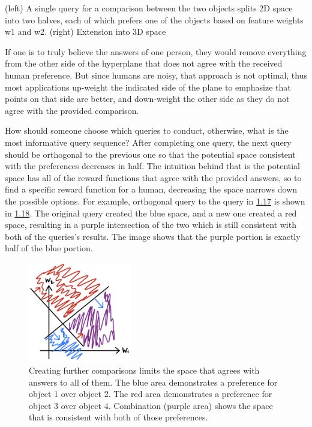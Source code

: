 \documentclass[
  letterpaper,
  DIV=11,
  numbers=noendperiod,
  oneside]{scrreprt}
\theoremstyle{remark}
\begin{document}
(left) A single query for a comparison between the two objects splits 2D
space into two halves, each of which prefers one of the objects based on
feature weights {w1} and {w2}. (right) Extension into 3D space

If one is to truly believe the answers of one person, they would remove
everything from the other side of the hyperplane that does not agree
with the received human preference. But since humans are noisy, that
approach is not optimal, thus most applications up-weight the indicated
side of the plane to emphasize that points on that side are better, and
down-weight the other side as they do not agree with the provided
comparison.

How should someone choose which queries to conduct, otherwise, what is
the most informative query sequence? After completing one query, the
next query should be orthogonal to the previous one so that the
potential space consistent with the preferences decreases in half. The
intuition behind that is the potential space has all of the reward
functions that agree with the provided answers, so to find a specific
reward function for a human, decreasing the space narrows down the
possible options. For example, orthogonal query to the query in
\hyperref[fig:2dcomp]{1.17} is shown in \hyperref[fig:2dspace]{1.18}.
The original query created the blue space, and a new one created a red
space, resulting in a purple intersection of the two which is still
consistent with both of the queries's results. The image shows that the
purple portion is exactly half of the blue portion.

\begin{figure}

{\centering \includegraphics[width=0.4\textwidth,height=\textheight]{src/Figures/2D-space.jpg}

}

\caption{Creating further comparisons limits the space that agrees with
answers to all of them. The blue area demonstrates a preference for
object 1 over object 2. The red area demonstrates a preference for
object 3 over object 4. Combination (purple area) shows the space that
is consistent with both of those preferences.}

\end{figure}%
\end{document}
